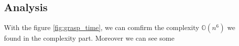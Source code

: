 
\subsection{Analysis}

With the figure \ref{fig:grasp_time}, we can comfirm the complexity $\mathbb{O}(n^6)$ we found in the complexity part.
Moreover we can see some 